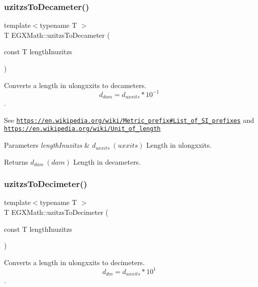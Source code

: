 \subsubsection{\texorpdfstring{uzitzs\+To\+Decameter()}{uzitzsToDecameter()}}
{\footnotesize\ttfamily template$<$typename T $>$ \\
T E\+G\+X\+Math\+::uzitzs\+To\+Decameter (\begin{DoxyParamCaption}\item[{const T}]{length\+Inuzitzs }\end{DoxyParamCaption})}



Converts a length in ulongxxits to decameters. \[ d_{dam}=d_{uxxits} * 10^{-1} \]. 

See \href{https://en.wikipedia.org/wiki/Metric_prefix#List_of_SI_prefixes}{\tt https\+://en.\+wikipedia.\+org/wiki/\+Metric\+\_\+prefix\#\+List\+\_\+of\+\_\+\+S\+I\+\_\+prefixes} and \href{https://en.wikipedia.org/wiki/Unit_of_length}{\tt https\+://en.\+wikipedia.\+org/wiki/\+Unit\+\_\+of\+\_\+length} 
\begin{DoxyParams}{Parameters}
{\em length\+Inuzitzs} & $ d_{uxxits}\ (uxxits)$ Length in ulongxxits. \\
\hline
\end{DoxyParams}
\begin{DoxyReturn}{Returns}
$ d_{dam}\ (dam)$ Length in decameters. 
\end{DoxyReturn}
\mbox{\label{group___e_g_x_math-_conversions-_length_conversions-uzitzs-_s_i_ga178324834750df4df1026a8900fadbcc}} 
\subsubsection{\texorpdfstring{uzitzs\+To\+Decimeter()}{uzitzsToDecimeter()}}
{\footnotesize\ttfamily template$<$typename T $>$ \\
T E\+G\+X\+Math\+::uzitzs\+To\+Decimeter (\begin{DoxyParamCaption}\item[{const T}]{length\+Inuzitzs }\end{DoxyParamCaption})}



Converts a length in ulongxxits to decimeters. \[ d_{dm}=d_{uxxits} * 10^{1} \]. 

